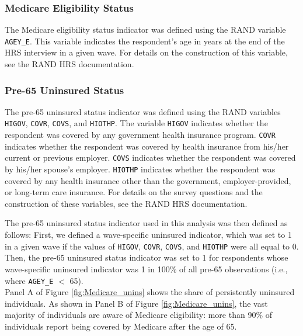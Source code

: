 \subsubsection{Medicare Eligibility Status}
\label{supsec:eligmc}
The Medicare eligibility status indicator was defined using the RAND variable {\tt AGEY\_E}. This variable indicates the respondent's age in years at the end of the HRS interview in a given wave. For details on the construction of this variable, see the RAND HRS documentation. %


\subsubsection{Pre-65 Uninsured Status}
\label{supsec:pre65uninsured}
The pre-65 uninsured status indicator was defined using the RAND variables {\tt HIGOV}, {\tt COVR}, {\tt COVS},  and {\tt HIOTHP}. The variable {\tt HIGOV} indicates whether the respondent was covered by any government health insurance program. {\tt COVR} indicates whether the respondent was covered by health insurance from his/her current or previous employer. {\tt COVS} indicates whether the respondent was covered by his/her spouse's employer. {\tt HIOTHP} indicates whether the respondent was covered by any health insurance other than the government, employer-provided, or long-term care insurance. For details on the survey questions and the construction of these variables, see the RAND HRS documentation. %

The pre-65 uninsured status indicator used in this analysis was then defined as follows: First, we defined a wave-specific uninsured indicator, which was set to 1 in a given wave if the values of {\tt HIGOV}, {\tt COVR}, {\tt COVS},  and {\tt HIOTHP} were all equal to 0. Then, the pre-65 uninsured status indicator was set to 1 for respondents whose wave-specific uninsured indicator was 1 in 100\% of all pre-65 observations (i.e., where {\tt AGEY\_E} $<$ 65).\\

Panel A of Figure \ref{fig:Medicare_unins} shows the share of persistently uninsured individuals.
As shown in Panel B of Figure \ref{fig:Medicare_unins}, the vast majority of individuals are aware of Medicare eligibility: more than 90\% of individuals report being covered by Medicare after the age of 65.

